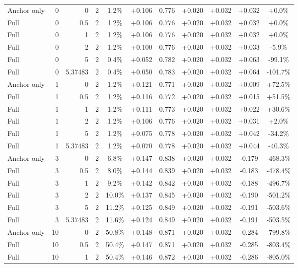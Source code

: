 \begin{table}[htbp]
\begin{tabular}{lrrrccccccc}
Anchor only & 0 & 0 & 2 & 1.2\% & +0.106 & 0.776 & +0.020 & +0.032 & +0.032 & +0.0\% \\
Full & 0 & 0.5 & 2 & 1.2\% & +0.106 & 0.776 & +0.020 & +0.032 & +0.032 & +0.0\% \\
Full & 0 & 1 & 2 & 1.2\% & +0.106 & 0.776 & +0.020 & +0.032 & +0.032 & +0.0\% \\
Full & 0 & 2 & 2 & 1.2\% & +0.100 & 0.776 & +0.020 & +0.032 & +0.033 & -5.9\% \\
Full & 0 & 5 & 2 & 0.4\% & +0.052 & 0.782 & +0.020 & +0.032 & +0.063 & -99.1\% \\
Full & 0 & 5.37483 & 2 & 0.4\% & +0.050 & 0.783 & +0.020 & +0.032 & +0.064 & -101.7\% \\
Anchor only & 1 & 0 & 2 & 1.2\% & +0.121 & 0.771 & +0.020 & +0.032 & +0.009 & +72.5\% \\
Full & 1 & 0.5 & 2 & 1.2\% & +0.116 & 0.772 & +0.020 & +0.032 & +0.015 & +51.5\% \\
Full & 1 & 1 & 2 & 1.2\% & +0.111 & 0.773 & +0.020 & +0.032 & +0.022 & +30.6\% \\
Full & 1 & 2 & 2 & 1.2\% & +0.106 & 0.776 & +0.020 & +0.032 & +0.031 & +2.0\% \\
Full & 1 & 5 & 2 & 1.2\% & +0.075 & 0.778 & +0.020 & +0.032 & +0.042 & -34.2\% \\
Full & 1 & 5.37483 & 2 & 1.2\% & +0.070 & 0.778 & +0.020 & +0.032 & +0.044 & -40.3\% \\
Anchor only & 3 & 0 & 2 & 6.8\% & +0.147 & 0.838 & +0.020 & +0.032 & -0.179 & -468.3\% \\
Full & 3 & 0.5 & 2 & 8.0\% & +0.144 & 0.839 & +0.020 & +0.032 & -0.183 & -478.4\% \\
Full & 3 & 1 & 2 & 9.2\% & +0.142 & 0.842 & +0.020 & +0.032 & -0.188 & -496.7\% \\
Full & 3 & 2 & 2 & 10.0\% & +0.137 & 0.845 & +0.020 & +0.032 & -0.190 & -501.2\% \\
Full & 3 & 5 & 2 & 11.2\% & +0.125 & 0.849 & +0.020 & +0.032 & -0.191 & -503.6\% \\
Full & 3 & 5.37483 & 2 & 11.6\% & +0.124 & 0.849 & +0.020 & +0.032 & -0.191 & -503.5\% \\
Anchor only & 10 & 0 & 2 & 50.8\% & +0.148 & 0.871 & +0.020 & +0.032 & -0.284 & -799.8\% \\
Full & 10 & 0.5 & 2 & 50.4\% & +0.147 & 0.871 & +0.020 & +0.032 & -0.285 & -803.4\% \\
Full & 10 & 1 & 2 & 50.4\% & +0.146 & 0.872 & +0.020 & +0.032 & -0.286 & -805.0\% \\

\end{tabular}
\end{table}
